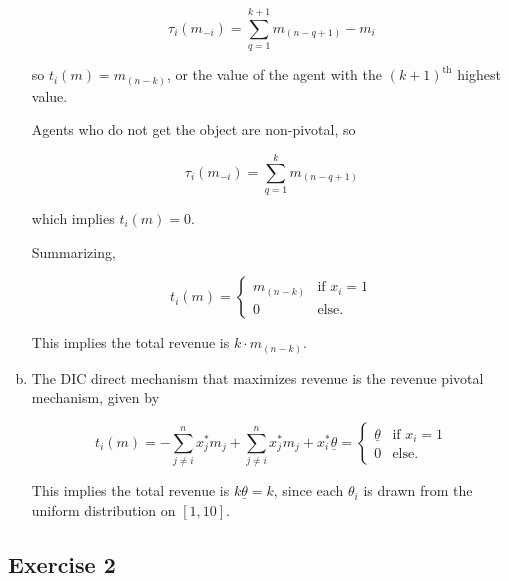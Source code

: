 \documentclass{article}
\begin{document}
\begin{enumerate}[(a)]
	\begin{equation*}
	\tau_i(m_{-i}) = \sum \limits_{q=1}^{k+1} m_{(n-q + 1)} - m_i
	\end{equation*}

	so $t_i(m) = m_{(n-k)}$, or the value of the agent with the $(k+1)^\text{th}$ highest value.

	Agents who do not get the object are non-pivotal, so

	\begin{equation*}
	\tau_i(m_{-i}) = \sum \limits_{q=1}^k m_{(n-q + 1)}
	\end{equation*}

	which implies $t_i(m) = 0$.

	Summarizing,

	\begin{equation*}
	t_i(m) = \begin{cases} 
      m_{(n-k)} & \text{if } x_i = 1 \\
      0 & \text{else.}
   \end{cases}
	\end{equation*}

	This implies the total revenue is $k \cdot m_{(n-k)}$.

	\item 

	The DIC direct mechanism that maximizes revenue is the revenue pivotal mechanism, given by 

	\begin{equation*}
	t_i(m) = -\sum \limits_{j \neq i}^n x^*_j m_j + \sum \limits_{j \neq i}^n x^*_j m_j + x^*_i \underline{\theta} = \begin{cases} 
      \underline{\theta} & \text{if } x_i = 1 \\
      0 & \text{else.}
   \end{cases}
	\end{equation*}

	This implies the total revenue is $k \underline{\theta} = k$, since each $\theta_i$ is drawn from the uniform distribution on $[1,10]$.

\end{enumerate}

\subsection*{Exercise 2}
\end{document}

